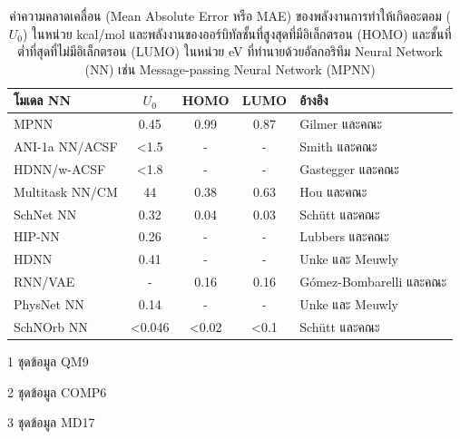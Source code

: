 \begin{table}[H]
    \begin{threeparttable}[b]
    \centering
    \caption{ค่าความคลาดเคลื่อน (Mean Absolute Error หรือ MAE) ของพลังงานการทำให้เกิดอะตอม ($U_{0}$) ในหน่วย kcal/mol 
    และพลังงานของออร์บิทัลชั้นที่สูงสุดที่มีอิเล็กตรอน (HOMO) และชั้นที่ต่ำที่สุดที่ไม่มีอิเล็กตรอน (LUMO) ในหน่วย eV ที่ทำนายด้วยอัลกอริทึม 
    Neural Network (NN) เช่น Message-passing Neural Network (MPNN)}
    \label{tab:pred_ener_atom_orb_nn}
    \begin{tabular}{lcccl}
    \toprule
    \textbf{โมเดล NN} &\textbf{$U_{0}$} &HOMO &LUMO &\textbf{อ้างอิง} \\
    \midrule
    MPNN\tnote{1} &0.45 &0.99 &0.87 &Gilmer และคณะ\autocite{gilmer2017} \\
    ANI-1a NN/ACSF\tnote{2} &<1.5 &- &- &Smith และคณะ\autocite{smith2017,smith2018,smith2019} \\
    HDNN/w-ACSF\tnote{1} &<1.8 &- &- &Gastegger และคณะ\autocite{gastegger2018} \\
    Multitask NN/CM\tnote{1} &44 &0.38 &0.63 &Hou และคณะ\autocite{hou2018} \\
    SchNet NN\tnote{1} &0.32 &0.04 &0.03 &Schütt และคณะ\autocite{schutt2018} \\
    HIP-NN\tnote{1} &0.26 &- &- &Lubbers และคณะ\autocite{lubbers2018} \\
    HDNN\tnote{1} &0.41 &- &- &Unke และ Meuwly\autocite{unke2018} \\
    RNN/VAE\tnote{1} &- &0.16 &0.16 &G\'{o}mez-Bombarelli และคณะ\autocite{gomez-bombarelli2018} \\
    PhysNet NN\tnote{1} &0.14 &- &- &Unke และ Meuwly\autocite{unke2019} \\
    SchNOrb NN\tnote{3} &<0.046 &<0.02 &<0.1 &Sch\"{u}tt และคณะ\autocite{schutt2019a} \\
    \bottomrule
    \end{tabular}
    \begin{tablenotes}
        \item [1]ชุดข้อมูล QM9
        \item [2]ชุดข้อมูล COMP6
        \item [3]ชุดข้อมูล MD17
      \end{tablenotes}
    \end{threeparttable}
\end{table}

\autocite{pereira2017,stuke2019,chang2019,rahaman2020,moore2022,ye2022}

